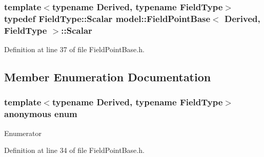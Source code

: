 \hypertarget{structmodel_1_1_field_point_base_a3dda233ae4c7db5b714a8a3f25486dde}{}
\subsubsection[{Scalar}]{\setlength{\rightskip}{0pt plus 5cm}template$<$typename Derived, typename Field\+Type$>$ typedef Field\+Type\+::\+Scalar {\bf model\+::\+Field\+Point\+Base}$<$ Derived, Field\+Type $>$\+::{\bf Scalar}}\label{structmodel_1_1_field_point_base_a3dda233ae4c7db5b714a8a3f25486dde}


Definition at line 37 of file Field\+Point\+Base.\+h.



\subsection{Member Enumeration Documentation}
\hypertarget{structmodel_1_1_field_point_base_a1d9fdd2d53d3c5ddead347874493d855}{}\subsubsection[{anonymous enum}]{\setlength{\rightskip}{0pt plus 5cm}template$<$typename Derived, typename Field\+Type$>$ anonymous enum}\label{structmodel_1_1_field_point_base_a1d9fdd2d53d3c5ddead347874493d855}
\begin{Desc}
\item[Enumerator]\par
\begin{description}
\item[{\em 
\hypertarget{structmodel_1_1_field_point_base_a1d9fdd2d53d3c5ddead347874493d855af0f958d8d671d90e3ea2c2fddc6644c2}{}rows\label{structmodel_1_1_field_point_base_a1d9fdd2d53d3c5ddead347874493d855af0f958d8d671d90e3ea2c2fddc6644c2}
}]\end{description}
\end{Desc}


Definition at line 34 of file Field\+Point\+Base.\+h.

